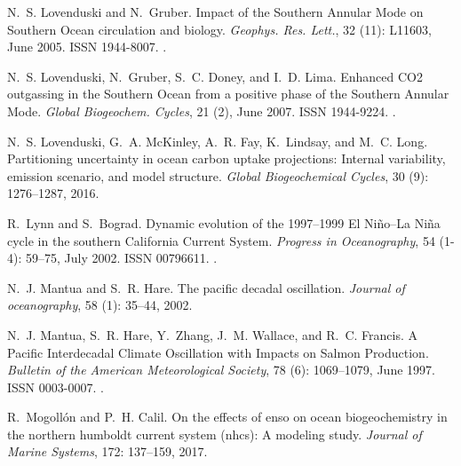 \documentclass[hvmath, online,bgd]{copernicus_discussions}
\begin{document}
\begin{thebibliography}{84}
	N.~S. Lovenduski and N.~Gruber.
	\newblock Impact of the {Southern} {Annular} {Mode} on {Southern} {Ocean}
	circulation and biology.
	\newblock \emph{Geophys. Res. Lett.}, 32 (11): L11603, June
	2005.
	\newblock ISSN 1944-8007.
	\newblock {}.
	
	N.~S. Lovenduski, N.~Gruber, S.~C. Doney, and I.~D. Lima.
	\newblock Enhanced {CO}2 outgassing in the {Southern} {Ocean} from a positive
	phase of the {Southern} {Annular} {Mode}.
	\newblock \emph{Global Biogeochem. Cycles}, 21 (2), June 2007.
	\newblock ISSN 1944-9224.
	\newblock {}.
	
	N.~S. Lovenduski, G.~A. McKinley, A.~R. Fay, K.~Lindsay, and M.~C. Long.
	\newblock Partitioning uncertainty in ocean carbon uptake projections: Internal
	variability, emission scenario, and model structure.
	\newblock \emph{Global Biogeochemical Cycles}, 30 (9):
	1276--1287, 2016.
	
	R.~Lynn and S.~Bograd.
	\newblock Dynamic evolution of the 1997--1999 {El} {Ni{\~n}o}--{La} {Ni{\~n}a}
	cycle in the southern {California} {Current} {System}.
	\newblock \emph{Progress in Oceanography}, 54 (1-4): 59--75,
	July 2002.
	\newblock ISSN 00796611.
	\newblock {}.
	
	N.~J. Mantua and S.~R. Hare.
	\newblock The pacific decadal oscillation.
	\newblock \emph{Journal of oceanography}, 58 (1): 35--44,
	2002.
	
	N.~J. Mantua, S.~R. Hare, Y.~Zhang, J.~M. Wallace, and R.~C. Francis.
	\newblock A {Pacific} {Interdecadal} {Climate} {Oscillation} with {Impacts} on
	{Salmon} {Production}.
	\newblock \emph{Bulletin of the American Meteorological Society}, 78
	(6): 1069--1079, June 1997.
	\newblock ISSN 0003-0007.
	\newblock {}.
	
	R.~Mogoll{\'o}n and P.~H. Calil.
	\newblock On the effects of enso on ocean biogeochemistry in the northern
	humboldt current system (nhcs): A modeling study.
	\newblock \emph{Journal of Marine Systems}, 172: 137--159, 2017.
	

\end{thebibliography}
\end{document}
